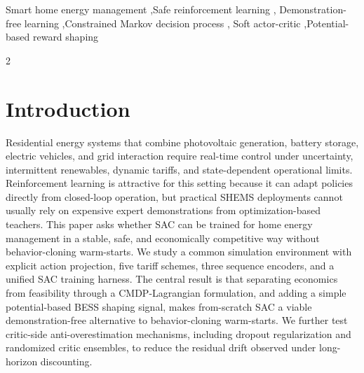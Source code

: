 \documentclass[preprint,12pt, 3p]{elsarticle}
\begin{document}
\begin{frontmatter}
\begin{highlights}
\end{highlights}

\glsresetall

\begin{keyword}
Smart home energy management \sep Safe reinforcement learning \sep
Demonstration-free learning \sep Constrained Markov decision process \sep
Soft actor-critic \sep Potential-based reward shaping
\end{keyword}


\end{frontmatter}


\begin{scriptsize}
\begin{multicols}{2}
    \glsnogroupskiptrue
    \printglossary[type=\acronymtype]
    \glsnogroupskiptrue
\end{multicols}
\end{scriptsize}




\section{Introduction}

Residential energy systems that combine photovoltaic generation, battery storage, electric vehicles, and grid interaction require real-time control under uncertainty, intermittent renewables, dynamic tariffs, and state-dependent operational limits. Reinforcement learning is attractive for this setting because it can adapt policies directly from closed-loop operation, but practical \gls{SHEMS} deployments cannot usually rely on expensive expert demonstrations from optimization-based teachers. This paper asks whether \gls{SAC} can be trained for home energy management in a stable, safe, and economically competitive way without behavior-cloning warm-starts. We study a common simulation environment with explicit action projection, five tariff schemes, three sequence encoders, and a unified \gls{SAC} training harness. The central result is that separating economics from feasibility through a \gls{CMDP}-Lagrangian formulation, and adding a simple potential-based \gls{BESS} shaping signal, makes from-scratch \gls{SAC} a viable demonstration-free alternative to behavior-cloning warm-starts. We further test critic-side anti-overestimation mechanisms, including dropout regularization and randomized critic ensembles, to reduce the residual drift observed under long-horizon discounting.
\end{document}
